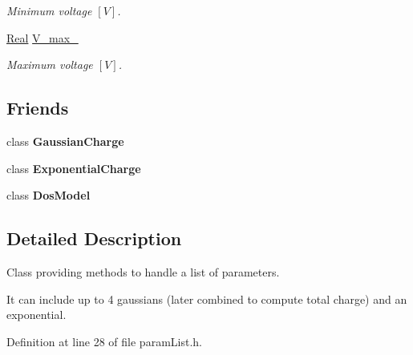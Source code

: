 \begin{DoxyCompactItemize}
\begin{DoxyCompactList}\small\item\em Minimum voltage $ \left[ V \right] $. \end{DoxyCompactList}\item 
\hypertarget{classParamList_afc5968e07015183cc569c8c286613cda}{\hyperlink{typedefs_8h_a060b837c3b4486ee35317744156f3da2}{Real} \hyperlink{classParamList_afc5968e07015183cc569c8c286613cda}{V\-\_\-max\-\_\-}}\label{classParamList_afc5968e07015183cc569c8c286613cda}

\begin{DoxyCompactList}\small\item\em Maximum voltage $ \left[ V \right] $. \end{DoxyCompactList}\end{DoxyCompactItemize}
\subsection*{Friends}
\begin{DoxyCompactItemize}
\item 
\hypertarget{classParamList_a6be33a81953be5c0377a00dec7d5b1d3}{class {\bfseries Gaussian\-Charge}}\label{classParamList_a6be33a81953be5c0377a00dec7d5b1d3}

\item 
\hypertarget{classParamList_a37daff3fd9f1cdb4519d878b4501d38b}{class {\bfseries Exponential\-Charge}}\label{classParamList_a37daff3fd9f1cdb4519d878b4501d38b}

\item 
\hypertarget{classParamList_a0200762a1ea62a10cc0aed231c12f279}{class {\bfseries Dos\-Model}}\label{classParamList_a0200762a1ea62a10cc0aed231c12f279}

\end{DoxyCompactItemize}


\subsection{Detailed Description}
Class providing methods to handle a list of parameters. 

It can include up to 4 gaussians (later combined to compute total charge) and an exponential. 

Definition at line 28 of file param\-List.\-h.



